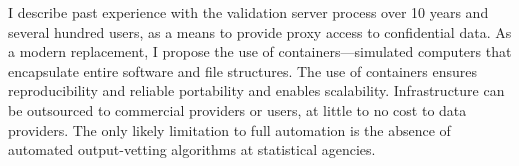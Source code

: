 I describe past experience with the validation server process over 10 years and several hundred users, as a means to provide proxy access to confidential data. As a modern replacement, I propose the use of containers---simulated computers that encapsulate entire software and file structures. The use of containers ensures reproducibility and reliable portability and enables scalability. Infrastructure can be outsourced to commercial providers or users, at little to no cost to data providers. The only likely limitation to full automation is the absence of automated output-vetting algorithms at statistical agencies.